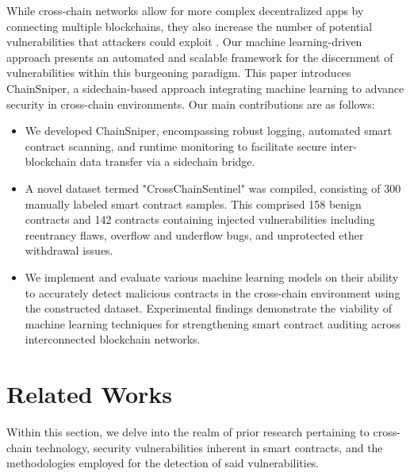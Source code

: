 \documentclass[sigconf]{acmart}
\begin{document}
While cross-chain networks allow for more complex decentralized apps by connecting multiple blockchains, they also increase the number of potential vulnerabilities that attackers could exploit \cite{mao2022survey}. Our machine learning-driven approach presents an automated and scalable framework for the discernment of vulnerabilities within this burgeoning paradigm. This paper introduces ChainSniper, a sidechain-based approach integrating machine learning to advance security in cross-chain environments. Our main contributions are as follows:
\begin{itemize}
    \item We developed ChainSniper, encompassing robust logging, automated smart contract scanning, and runtime monitoring to facilitate secure inter-blockchain data transfer via a sidechain bridge.
    \item A novel dataset termed "CrossChainSentinel" was compiled, consisting of 300 manually labeled smart contract samples. This comprised 158 benign contracts and 142 contracts containing injected vulnerabilities including reentrancy flaws, overflow and underflow bugs, and unprotected ether withdrawal issues.
    \item We implement and evaluate various machine learning models on their ability to accurately detect malicious contracts in the cross-chain environment using the constructed dataset. Experimental findings demonstrate the viability of machine learning techniques for strengthening smart contract auditing across interconnected blockchain networks.
\end{itemize}

\section{Related Works}
Within this section, we delve into the realm of prior research pertaining to cross-chain technology, security vulnerabilities inherent in smart contracts, and the methodologies employed for the detection of said vulnerabilities.
\end{document}
